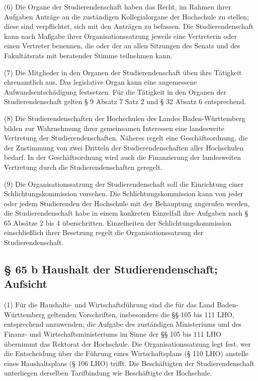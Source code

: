 \documentclass[
10pt,
a4paper,
twoside,								%
titlepage=false,							%
draft=false								%
]{scrartcl}
\begin{document}
(6) Die Organe der Studierendenschaft haben das Recht, im Rahmen ihrer Aufgaben Anträge an die zuständigen Kollegialorgane der Hochschule zu stellen; diese sind verpflichtet, sich mit den Anträgen zu befassen. Die Studierendenschaft kann nach Maßgabe ihrer Organisationssatzung jeweils eine Vertreterin oder einen Vertreter benennen, die oder der an allen Sitzungen des Senats und des Fakultätsrats mit beratender Stimme teilnehmen kann.

(7) Die Mitglieder in den Organen der Studierendenschaft üben ihre Tätigkeit ehrenamtlich aus. Das legislative Organ kann eine angemessene Aufwandsentschädigung festsetzen. Für die Tätigkeit in den Organen der Studierendenschaft gelten § 9 Absatz 7 Satz 2 und § 32 Absatz 6 entsprechend.

(8) Die Studierendenschaften der Hochschulen des Landes Baden-Württemberg bilden zur Wahrnehmung ihrer gemeinsamen Interessen eine landesweite Vertretung der Studierendenschaften. Näheres regelt eine Geschäftsordnung, die der Zustimmung von zwei Dritteln der Studierendenschaften aller Hochschulen bedarf. In der Geschäftsordnung wird auch die Finanzierung der landesweiten Vertretung durch die Studierendenschaften geregelt.

(9) Die Organisationssatzung der Studierendenschaft soll die Einrichtung einer Schlichtungskommission vorsehen. Die Schlichtungskommission kann von jeder oder jedem Studierenden der Hochschule mit der Behauptung angerufen werden, die Studierendenschaft habe in einem konkreten Einzelfall ihre Aufgaben nach § 65 Absätze 2 bis 4 überschritten. Einzelheiten der Schlichtungskommission einschließlich ihrer Besetzung regelt die Organisationssatzung der Studierendenschaft.


\subsection{§ 65 b Haushalt der Studierendenschaft; Aufsicht}

(1) Für die Haushalts- und Wirtschaftsführung sind die für das Land Baden-Württemberg geltenden Vorschriften, insbesondere die §§ 105 bis 111 LHO, entsprechend anzuwenden; die Aufgabe des zuständigen Ministeriums und des Finanz- und Wirtschaftsministeriums im Sinne der §§ 105 bis 111 LHO übernimmt das Rektorat der Hochschule. Die Organisationssatzung legt fest, wer die Entscheidung über die Führung eines Wirtschaftsplans (§ 110 LHO) anstelle eines Haushaltsplans (§ 106 LHO) trifft. Die Beschäftigten der Studierendenschaft unterliegen derselben Tarifbindung wie Beschäftigte der Hochschule.
\end{document}
